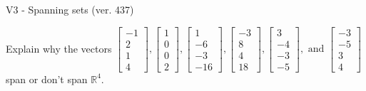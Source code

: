 \begin{exercise}
  \begin{exerciseTitle}V3 - Spanning sets (ver. 437)\end{exerciseTitle}
  \begin{exerciseStatement}
    Explain why the vectors \(\left[\begin{array}{r}
-1 \\
2 \\
1 \\
4
\end{array}\right] , \left[\begin{array}{r}
1 \\
0 \\
0 \\
2
\end{array}\right] , \left[\begin{array}{r}
1 \\
-6 \\
-3 \\
-16
\end{array}\right] , \left[\begin{array}{r}
-3 \\
8 \\
4 \\
18
\end{array}\right] , \left[\begin{array}{r}
3 \\
-4 \\
-3 \\
-5
\end{array}\right] , \text{ and } \left[\begin{array}{r}
-3 \\
-5 \\
3 \\
4
\end{array}\right]\) span or don't span \(\mathbb{R}^4\). 
	



\end{exerciseStatement}
\end{exercise}
